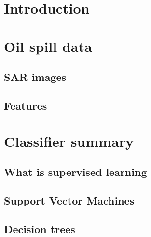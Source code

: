 \documentclass{article}
\begin{document}
\begin{multicols}{2} %

\section{Introduction}

  


\section{Oil spill data}

%

\subsection{SAR images}

	

\subsection{Features}
	
	


\section{Classifier summary}

\subsection{What is supervised learning}
%

\subsection{Support Vector Machines}
%

\subsection{Decision trees}
%


\end{multicols}
\end{document}
